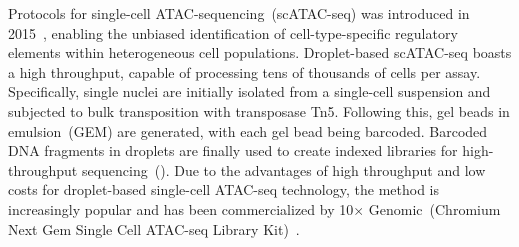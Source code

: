 Protocols for single-cell ATAC-sequencing~(scATAC-seq) was introduced in 2015~\citep{Buenrostro2015,cusanovich2015multiplex}, enabling the unbiased identification of cell-type-specific regulatory elements within heterogeneous cell populations. Droplet-based scATAC-seq boasts a high throughput, capable of processing tens of thousands of cells per assay. Specifically, single nuclei are initially isolated from a single-cell suspension and subjected to bulk transposition with transposase Tn5. Following this, gel beads in emulsion~(GEM) are generated, with each gel bead being barcoded. Barcoded DNA fragments in droplets are finally used to create indexed libraries for high-throughput sequencing~(). Due to the advantages of high throughput and low costs for droplet-based single-cell ATAC-seq technology, the method is increasingly popular and has been commercialized by 10$\times$ Genomic~(Chromium Next Gem Single Cell ATAC-seq Library Kit)~\citep{satpathy2019massively}.



